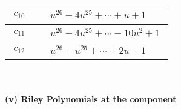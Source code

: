 \documentclass[1p]{elsarticle_modified}
\theoremstyle{definition}
\begin{document}
\begin{tabular}{m{50pt}|m{274pt}}
\hline $$\begin{aligned}c_{10}\end{aligned}$$&$\begin{aligned}
&u^{26}-4 u^{25}+\cdots+u+1
\end{aligned}$\\
\hline $$\begin{aligned}c_{11}\end{aligned}$$&$\begin{aligned}
&u^{26}-4 u^{25}+\cdots-10 u^2+1
\end{aligned}$\\
\hline $$\begin{aligned}c_{12}\end{aligned}$$&$\begin{aligned}
&u^{26}- u^{25}+\cdots+2 u-1
\end{aligned}$\\
\hline
\end{tabular}\\~\\
\newpage\renewcommand{\arraystretch}{1}
\flushleft \textbf{(v) Riley Polynomials at the component}\newline \\
\end{document}
